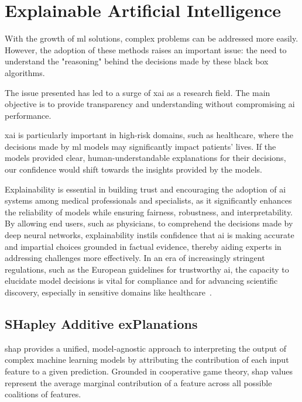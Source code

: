 


\section{Explainable Artificial Intelligence}

With the growth of \ac{ml} solutions, complex problems can be addressed more easily. However, the adoption of these methods raises an important issue: the need to understand the "reasoning" behind the decisions made by these black box algorithms.

The issue presented has led to a surge of \acf{xai} as a research field. The main objective is to provide transparency and understanding without compromising \ac{ai} performance.

\ac{xai} is particularly important in high-risk domains, such as healthcare, where the decisions made by \ac{ml} models may significantly impact patients' lives.
If the models provided clear, human-understandable explanations for their decisions, our confidence would shift towards the insights provided by the models.

Explainability is essential in building trust and encouraging the adoption of \ac{ai} systems among medical professionals and specialists, as it significantly enhances the reliability of models while ensuring fairness, robustness, and interpretability. By allowing end users, such as physicians, to comprehend the decisions made by deep neural networks, explainability instils confidence that \ac{ai} is making accurate and impartial choices grounded in factual evidence, thereby aiding experts in addressing challenges more effectively. In an era of increasingly stringent regulations, such as the European guidelines for trustworthy \ac{ai}, the capacity to elucidate model decisions is vital for compliance and for advancing scientific discovery, especially in sensitive domains like healthcare~\cite{ali_explainable_2023}. 

\subsection{SHapley Additive exPlanations}
\acf{shap} provides a unified, model‐agnostic approach to interpreting the output of complex machine learning models by attributing the contribution of each input feature to a given prediction. Grounded in cooperative game theory, \ac{shap} values represent the average marginal contribution of a feature across all possible coalitions of features. 

